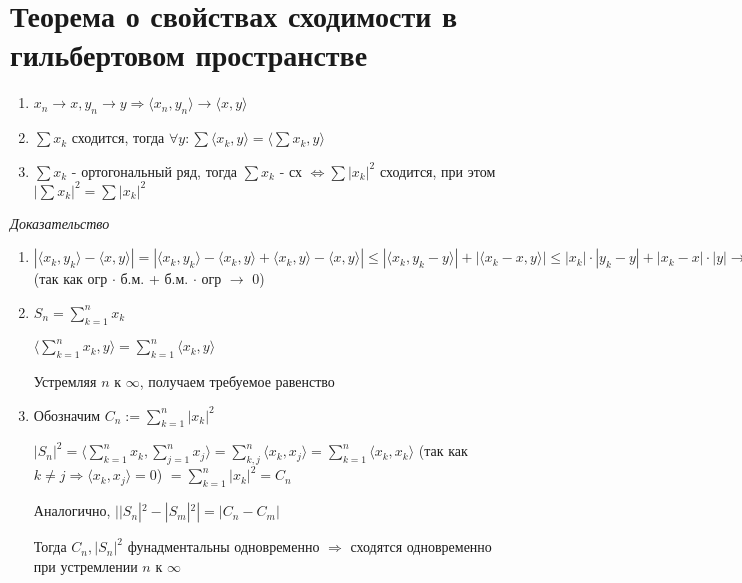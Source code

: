 \documentclass[paper=a4, fontsize=14pt]{report}
\begin{document}
    \section{Теорема о свойствах сходимости в гильбертовом пространстве}
    \begin{enumerate}
        \item $x_n \rightarrow x, y_n \rightarrow y \Rightarrow \langle x_n, y_n \rangle \rightarrow \langle x, y \rangle$

        \item $\sum x_k$ сходится, тогда $\forall y: \sum \langle x_k, y \rangle = \langle \sum x_k, y \rangle$

        \item $\sum x_k$ - ортогональный ряд, тогда $\sum x_k$ - сх $\Leftrightarrow \sum |x_k|^2$ сходится, при этом $|\sum x_k|^2 = \sum |x_k|^2$

    \end{enumerate}
    
    
    \emph{Доказательство}

\begin{enumerate}
	\item $|\langle x_k, y_k \rangle - \langle x, y \rangle| = |\langle x_k, y_k \rangle - \langle x_k, y\rangle  + \langle x_k, y\rangle  - \langle x, y\rangle | \leqslant |\langle x_k, y_k - y\rangle | + |\langle x_k - x, y\rangle | \leqslant |x_k| \cdot |y_k - y| + |x_k - x| \cdot |y| \rightarrow 0$ (так как огр $\cdot$ б.м. +  б.м. $\cdot$ огр $\rightarrow$ 0)

	\item $S_n = \sum\limits_{k = 1}^{n} x_k$

	$\langle \sum\limits_{k = 1}^n x_k, y\rangle  = \sum\limits_{k = 1}^n \langle x_k, y\rangle $

	Устремляя $n$ к $\infty$, получаем требуемое равенство

	\item Обозначим $C_n := \sum\limits_{k = 1}^n |x_k|^2$

	 $|S_n|^2 = \langle \sum\limits_{k = 1}^n x_k, \sum\limits_{j = 1}^n x_j\rangle  = \sum\limits_{k, j}^n \langle x_k, x_j\rangle  = \sum\limits_{k = 1}^n \langle x_k, x_k\rangle $ (так как $k \neq j \Rightarrow \langle x_k, x_j\rangle  = 0$) $= \sum\limits_{k = 1}^n |x_k|^2 = C_n$

	 Аналогично, $||S_n|^2 - |S_m|^2| = |C_n - C_m|$

	 Тогда $C_n, |S_n|^2$ фунадментальны одновременно $\Rightarrow$ сходятся одновременно при устремлении $n$ к $\infty$
\end{enumerate}
\end{document}
